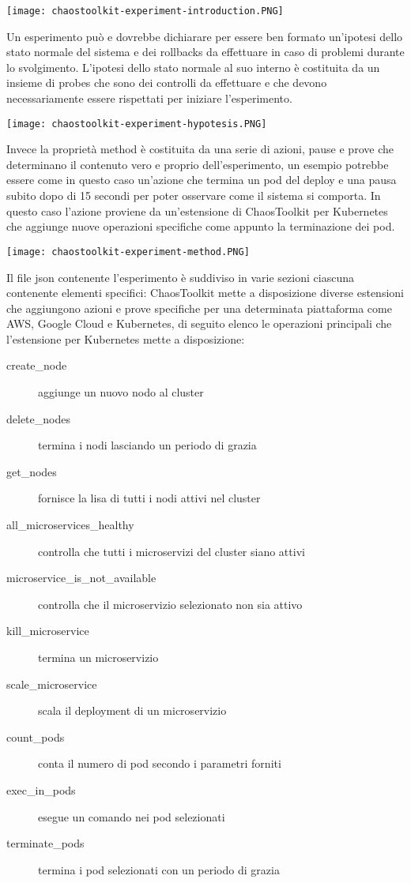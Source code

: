 \begin{center}
    \centering
    \texttt{[image: chaostoolkit-experiment-introduction.PNG]}
    \label{tab:introduzione-chaostoolkit}
\end{center}
Un esperimento può e dovrebbe dichiarare per essere ben formato un'ipotesi dello stato normale del sistema e dei rollbacks da effettuare in caso di problemi durante lo svolgimento.
L'ipotesi dello stato normale al suo interno è costituita da un insieme di probes che sono dei controlli da effettuare e che devono necessariamente essere rispettati per iniziare l'esperimento.
\begin{center}
    \centering
    \texttt{[image: chaostoolkit-experiment-hypotesis.PNG]}
    \label{tab:ipotesi-chaostoolkit}
\end{center}
Invece la proprietà method è costituita da una serie di azioni, pause e prove che determinano il contenuto vero e proprio dell'esperimento, un esempio potrebbe essere come in questo caso un'azione che termina un pod del deploy e una pausa subito dopo di 15 secondi per poter osservare come il sistema si comporta.
In questo caso l'azione proviene da un'estensione di ChaosToolkit per Kubernetes che aggiunge nuove operazioni specifiche come appunto la terminazione dei pod.
\begin{center}
    \centering
    \texttt{[image: chaostoolkit-experiment-method.PNG]}
    \label{tab:method-chaostoolkit}
\end{center}

Il file json contenente l'esperimento è suddiviso in varie sezioni ciascuna contenente elementi specifici:
ChaosToolkit mette a disposizione diverse estensioni che aggiungono azioni e prove specifiche per una determinata piattaforma come AWS, Google Cloud e Kubernetes, di seguito elenco le operazioni principali che l'estensione per Kubernetes mette a disposizione:
\begin{description}
    \item[create\_node] aggiunge un nuovo nodo al cluster
    \item[delete\_nodes] termina i nodi lasciando un periodo di grazia
    \item[get\_nodes] fornisce la lisa di tutti i nodi attivi nel cluster
    \item[all\_microservices\_healthy] controlla che tutti i microservizi del cluster siano attivi
    \item[microservice\_is\_not\_available] controlla che il microservizio selezionato non sia attivo
    \item[kill\_microservice] termina un microservizio
    \item[scale\_microservice] scala il deployment di un microservizio
    \item[count\_pods] conta il numero di pod secondo i parametri forniti
    \item[exec\_in\_pods] esegue un comando nei pod selezionati
    \item[terminate\_pods] termina i pod selezionati con un periodo di grazia 
\end{description}

